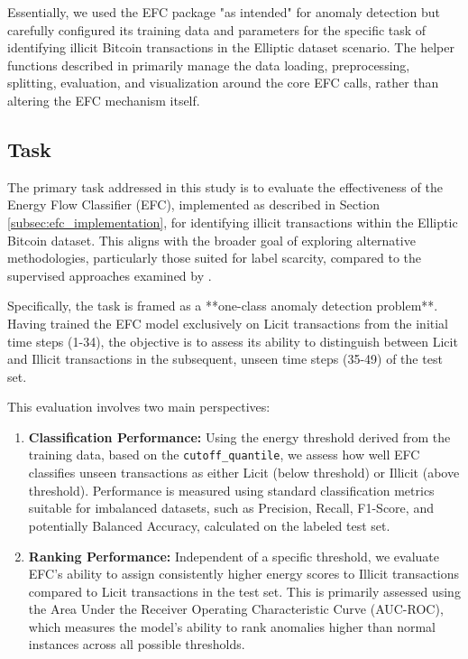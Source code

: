 \documentclass[12pt]{article}
\begin{document}
Essentially, we used the EFC package "as intended" for anomaly detection but carefully configured its training data and
parameters for the specific task of identifying illicit Bitcoin transactions in the Elliptic dataset scenario. The helper
functions described in \cite{reproducibility} primarily manage the data loading, preprocessing, splitting, evaluation,
and visualization around the core EFC calls, rather than altering the EFC mechanism itself.


\subsection{Task} \label{subsec:task}

The primary task addressed in this study is to evaluate the effectiveness of the Energy Flow Classifier (EFC), implemented
as described in Section \ref{subsec:efc_implementation}, for identifying illicit transactions within the Elliptic
Bitcoin dataset. This aligns with the broader goal of exploring alternative methodologies, particularly those suited for
label scarcity, compared to the supervised approaches examined by \cite{lorenz2021machinelearningmethodsdetect}.

Specifically, the task is framed as a **one-class anomaly detection problem**. Having trained the EFC model exclusively
on Licit transactions from the initial time steps (1-34), the objective is to assess its ability to distinguish between
Licit and Illicit transactions in the subsequent, unseen time steps (35-49) of the test set.

This evaluation involves two main perspectives:

\begin{enumerate}
    \item \textbf{Classification Performance:} Using the energy threshold derived from the training data, based on the
      \texttt{cutoff\_quantile}, we assess how well EFC classifies unseen transactions as either Licit (below threshold)
      or Illicit (above threshold). Performance is measured using standard classification metrics suitable for imbalanced
      datasets, such as Precision, Recall, F1-Score, and potentially Balanced Accuracy, calculated on the labeled test set.
    \item \textbf{Ranking Performance:} Independent of a specific threshold, we evaluate EFC's ability to assign consistently
      higher energy scores to Illicit transactions compared to Licit transactions in the test set. This is primarily
      assessed using the Area Under the Receiver Operating Characteristic Curve (AUC-ROC), which measures the model's
      ability to rank anomalies higher than normal instances across all possible thresholds.
\end{enumerate}
\end{document}

